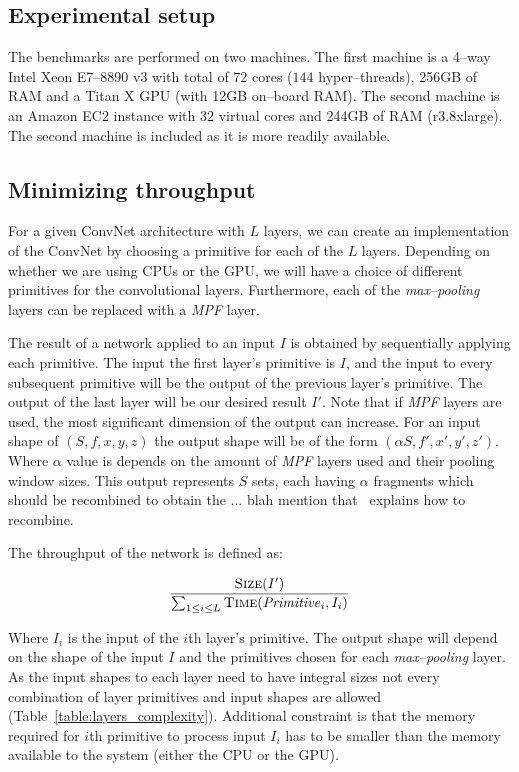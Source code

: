 \documentclass[conference]{./IEEEtran/IEEEtran}
\begin{document}
\subsection{Experimental setup}

  The benchmarks are performed on two machines.  The first machine is
  a 4--way Intel Xeon E7--8890 v3 with total of $72$ cores ($144$
  hyper--threads), 256GB of RAM and a Titan X GPU (with 12GB on--board
  RAM).  The second machine is an Amazon EC2 instance with $32$
  virtual cores and 244GB of RAM (r3.8xlarge).  The second machine is
  included as it is more readily available.

\subsection{Minimizing throughput}

  For a given ConvNet architecture with $L$ layers, we can create an
  implementation of the ConvNet by choosing a primitive for each of
  the $L$ layers.  Depending on whether we are using CPUs or the GPU,
  we will have a choice of different primitives for the convolutional
  layers.  Furthermore, each of the \emph{max--pooling} layers can be
  replaced with a \emph{MPF} layer.

  The result of a network applied to an input $I$ is obtained by
  sequentially applying each primitive.  The input the first layer's
  primitive is $I$, and the input to every subsequent primitive will
  be the output of the previous layer's primitive.  The output of the
  last layer will be our desired result $I'$.  Note that if \emph{MPF}
  layers are used, the most significant dimension of the output can
  increase.  For an input shape of $(S,f,x,y,z)$ the output shape will
  be of the form $(\alpha S,f',x',y',z')$.  Where $\alpha$ value is
  depends on the amount of \emph{MPF} layers used and their pooling
  window sizes.  This output represents $S$ sets, each having $\alpha$
  fragments which should be recombined to obtain the ... blah mention
  that~\cite{giusti2013fast,masci2013fast} explains how to recombine.

  The throughput of the network is defined as:

  $$\frac{\proc{Size}(I')}{\sum_{1 \le i \le L}
    \proc{Time}(\id{Primitive}_i,I_i)}$$

  Where $I_i$ is the input of the $i$th layer's primitive.  The output
  shape will depend on the shape of the input $I$ and the primitives
  chosen for each \emph{max--pooling} layer.  As the input shapes to
  each layer need to have integral sizes not every combination of
  layer primitives and input shapes are allowed
  (Table~\ref{table:layers_complexity}).  Additional constraint is
  that the memory required for $i$th primitive to process input $I_i$
  has to be smaller than the memory available to the system (either
  the CPU or the GPU).
\end{document}
